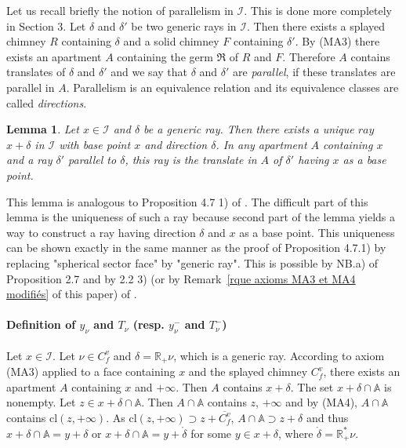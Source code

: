 \documentclass[12pt]{article}
\theoremstyle{plain}
\newtheorem{lemme}[thm]{Lemma}
\theoremstyle{definition}
\newcommand{\R}{\mathbb{R}}
\newcommand{\A}{\mathbb{A}}
\newcommand{\I}{\mathcal{I}}
\begin{document}
\vspace{3mm}
Let us recall briefly the notion of parallelism in $\I$. This is done more completely in \cite{rousseau2011masures} Section 3. Let $\delta$ and $\delta'$ be two generic rays in $\I$. Then there exists a splayed chimney $R$ containing $\delta$ and a solid chimney $F$ containing $\delta'$. By (MA3) there exists an apartment $A$ containing the germ $\mathfrak{R}$ of $R$ and $F$. Therefore $A$ contains translates of $\delta$ and $\delta'$ and we say that $\delta$ and $\delta'$ are \textit{parallel}, if these translates are parallel in $A$. Parallelism is an equivalence relation and its equivalence classes are called \textit{directions}.

\begin{lemme}\label{lemme demi-droite de base donnée}
Let $x\in \I$ and $\delta$ be a generic ray. Then there exists a unique $ray$ $x+\delta$ in $\I$ with base point $x$ and direction $\delta$. In any apartment $A$ containing $x$ and a ray $\delta'$ parallel to $\delta$, this ray is the translate in $A$ of $\delta'$ having $x$ as a base point.
\end{lemme}

This lemma is analogous to Proposition 4.7 1) of \cite{rousseau2011masures}. The difficult part of this lemma is the uniqueness of such a ray because second part of the lemma yields a way to construct a ray having direction $\delta$ and $x$ as a base point. This uniqueness can be shown exactly in the same manner as the proof of Proposition 4.7.1) by replacing "spherical sector face" by "generic ray". This is possible by NB.a) of Proposition 2.7 and by 2.2 3) (or by Remark~\ref{rque axioms MA3 et MA4 modifiés} of this paper) of \cite{rousseau2011masures}.


\paragraph{Definition of $y_\nu$ and $T_\nu$ (resp. $y^-_\nu$ and $T^-_\nu$)}
Let $x\in \mathcal{I}$. Let $\nu \in C_f^v$ and $\delta=\R_+\nu$, which is a generic ray. According to axiom (MA3) applied to a face containing $x$ and the splayed chimney $C^v_f$, there exists an apartment $A$ containing $x$ and $+\infty$. Then $A$ contains $x+\delta$. The set $x+\delta\cap \A$ is nonempty. Let $z\in x+\delta\cap \A$. Then $A\cap \A$ contains $z$, $+\infty$ and by (MA4), $A\cap\A$ contains $\mathrm{cl}(z,+\infty)$. As $\mathrm{cl}(z,+\infty)\supset z+\overline{C_f^v}$,  $A\cap\A \supset z+\delta$ and thus $x+\delta\cap \A=y+\delta$ or $x+\delta\cap \A=y+\mathring{\delta}$ for some $y\in x+\delta$, where $\mathring \delta=\R^*_+\nu$.
\end{document}

